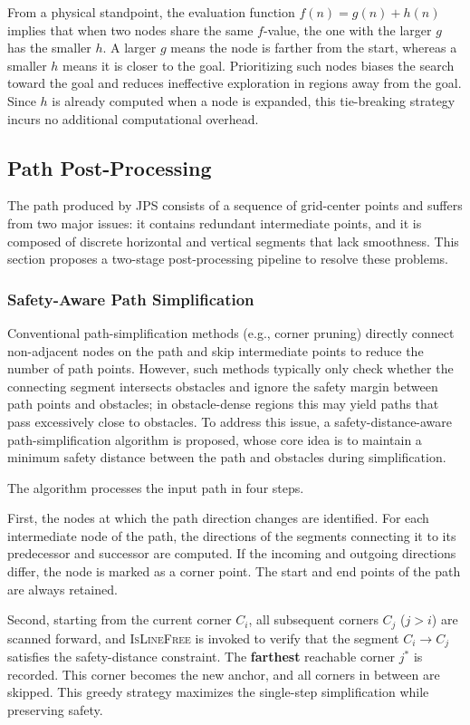From a physical standpoint, the evaluation function $f(n) = g(n) + h(n)$ implies that when two nodes share the same $f$-value, the one with the larger $g$ has the smaller $h$. A larger $g$ means the node is farther from the start, whereas a smaller $h$ means it is closer to the goal. Prioritizing such nodes biases the search toward the goal and reduces ineffective exploration in regions away from the goal. Since $h$ is already computed when a node is expanded, this tie-breaking strategy incurs no additional computational overhead.

\subsection{Path Post-Processing}
\label{subsec:post}

The path produced by JPS consists of a sequence of grid-center points and suffers from two major issues: it contains redundant intermediate points, and it is composed of discrete horizontal and vertical segments that lack smoothness. This section proposes a two-stage post-processing pipeline to resolve these problems.

\subsubsection{Safety-Aware Path Simplification}

Conventional path-simplification methods (e.g., corner pruning) directly connect non-adjacent nodes on the path and skip intermediate points to reduce the number of path points. However, such methods typically only check whether the connecting segment intersects obstacles and ignore the safety margin between path points and obstacles; in obstacle-dense regions this may yield paths that pass excessively close to obstacles. To address this issue, a safety-distance-aware path-simplification algorithm is proposed, whose core idea is to maintain a minimum safety distance between the path and obstacles during simplification.

The algorithm processes the input path in four steps.

First, the nodes at which the path direction changes are identified. For each intermediate node of the path, the directions of the segments connecting it to its predecessor and successor are computed. If the incoming and outgoing directions differ, the node is marked as a corner point. The start and end points of the path are always retained.

Second, starting from the current corner $C_i$, all subsequent corners $C_j$ ($j > i$) are scanned forward, and \textsc{IsLineFree} is invoked to verify that the segment $C_i \to C_j$ satisfies the safety-distance constraint. The \textbf{farthest} reachable corner $j^{*}$ is recorded. This corner becomes the new anchor, and all corners in between are skipped. This greedy strategy maximizes the single-step simplification while preserving safety.

